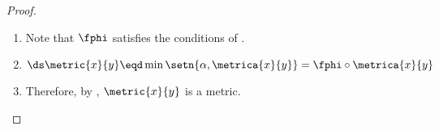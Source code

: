 \begin{proof}
\begin{enumerate}
  \item Note that $\fphi$ satisfies the conditions of .
  \item $\ds\metric{x}{y}\eqd \min\setn{\alpha,\metrica{x}{y}}=\fphi\circ\metrica{x}{y}$
  \item Therefore, by , $\metric{x}{y}$ is a metric.
\end{enumerate}




\end{proof}



